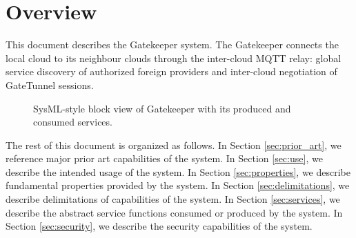 \documentclass[a4paper]{arrowhead}
\begin{document}
\section{Overview}
\label{sec:overview}

This document describes the Gatekeeper system. The Gatekeeper connects the local cloud to its neighbour clouds through the inter-cloud MQTT relay: global service discovery of authorized foreign providers and inter-cloud negotiation of GateTunnel sessions.

\begin{figure}[ht!]
  \centering
  \caption{SysML-style block view of Gatekeeper with its produced and consumed services.}
  \label{fig:system}
\end{figure}

The rest of this document is organized as follows.
In Section \ref{sec:prior_art}, we reference major prior art capabilities of the system.
In Section \ref{sec:use}, we describe the intended usage of the system.
In Section \ref{sec:properties}, we describe fundamental properties provided by the system.
In Section \ref{sec:delimitations}, we describe delimitations of capabilities of the system.
In Section \ref{sec:services}, we describe the abstract service functions consumed or produced by the system.
In Section \ref{sec:security}, we describe the security capabilities of the system.
\end{document}
